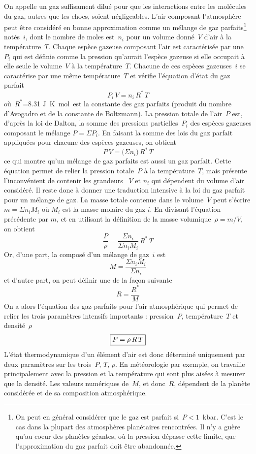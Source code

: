 \sk
On appelle  un gaz suffisament dilué pour que les interactions entre les molécules du gaz, autres que les chocs, soient négligeables. L'air composant l'atmosphère peut être considéré en bonne approximation comme un mélange de gaz parfaits\footnote{On peut en général considérer que le gaz est parfait si~$P < 1$~kbar. C'est le cas dans la plupart des atmosphères planétaires rencontrées. Il n'y a guère qu'au coeur des planètes géantes, où la pression dépasse cette limite, que l'approximation du gaz parfait doit être abandonnée.} notés~$i$, dont le nombre de moles est~$n_i$ pour un volume donné~$V$ d'air à la température~$T$. Chaque espèce gazeuse composant l'air est caractérisée par une ~$P_i$ qui est définie comme la pression qu'aurait l'espèce gazeuse si elle occupait à elle seule le volume~$V$ à la température~$T$. Chacune de ces espèces gazeuses~$i$ se caractérise par une même température~$T$ et vérifie l'équation d'état du gaz parfait $$ P_i \, V = n_i \, R^* \, T $$ où~$R^*$=8.31 J~K\mo~mol\mo~est la constante des gaz parfaits (produit du nombre d'Avogadro et de la constante de Boltzmann). La pression totale de l'air~$P$ est, d'après la loi de Dalton, la somme des pressions partielles~$P_i$ des espèces gazeuses composant le mélange $P=\Sigma P_i$. En faisant la somme des lois du gaz parfait appliquées pour chacune des espèces gazeuses, on obtient $$ P \, V = \big( \Sigma n_i \big) \, R^* \, T $$ ce qui montre qu'un mélange de gaz parfaits est aussi un gaz parfait. Cette équation permet de relier la pression totale~$P$ à la température~$T$, mais présente l'inconvénient de contenir les grandeurs ~$V$ et $n_i$ qui dépendent du volume d'air considéré. Il reste donc à donner une traduction intensive à la loi du gaz parfait pour un mélange de gaz. La masse totale contenue dans le volume~$V$ peut s'écrire $m=\Sigma n_iM_i$ où $M_i$ est la masse molaire du gaz $i$. En divisant l'équation précédente par $m$, et en utilisant la définition de la masse volumique~$\rho = m / V$, on obtient $$ \frac{P}{\rho} = \frac{\Sigma n_i}{\Sigma n_iM_i} \, R^* \, T $$ Or, d'une part, la  composé d'un mélange de gaz~$i$ est $$ \boxed{ M=\frac{\Sigma n_iM_i}{\Sigma n_i} }$$ et d'autre part, on peut définir une  de la façon suivante $$ R=\frac{R^*}{M} $$ On a alors l'équation des gaz parfaits pour l'air atmosphérique qui permet de relier les trois paramètres intensifs importants : pression~$P$, température~$T$ et densité~$\rho$ $$ \boxed{P = \rho \, R \,T} $$ L'état thermodynamique d'un élément d'air est donc déterminé uniquement par deux paramètres sur les trois~$P$, $T$, $\rho$. En météorologie par exemple, on travaille principalement avec la pression et la température qui sont plus aisées à mesurer que la densité. Les valeurs numériques de~$M$, et donc~$R$, dépendent de la planète considérée et de sa composition atmosphérique. 

